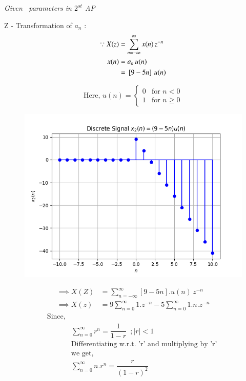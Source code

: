 \documentclass[journal,12pt,twocolumn]{IEEEtran}
\theoremstyle{remark}
\begin{document}
\begin{enumerate} [label=(\roman*)]
    \begin{table}[htbp] 
    \centering
    
    \vspace{0.2cm}
    \caption{\normalsize\textsl{Given \, parameters in $2^{st}$ AP}}
    \label{given parameters list}
    \end{table}

    Z - Transformation of $a_n$ :
    \begin{align}
        \because X(z) &= \sum_{n = -\infty}^{\infty}x(n) \, z^{-n} \\
         x(n)&= a_n\,u(n) \\
        & = {}\left[9-5n\right] \, u(n)
    \end{align}

    \[
    \text{Here},\, u(n) =
    \begin{cases}
        0 & \text{for } n < 0 \\
        1 & \text{for } n \geq 0 
    \end{cases}
    \]

    \begin{figure}[!h] 
    \centering
    \includegraphics[width=\columnwidth]{figs/signal_x2.png}
    \caption{}
    \label{fig:Graph2}
    \end{figure}
    \begin{align}
        \implies  X(Z) &= \sum_{n = -\infty}^{\infty}[9 - 5n].u(n) \, z^{-n} \\
        \implies X(z) &= 9 \sum_{n = 0}^{\infty} 1.z^{-n} - 5 \sum_{n = 0}^{\infty} 1.n.z^{-n}
    \end{align}
    \begin{align}
        \text{Since,} \nonumber\\
        &\sum_{n=0}^{\infty} r^n = \dfrac{1}{1-r}  \,\,\, 
        ; |r|<1 \\
        &\text{Differentiating w.r.t. 'r' and multiplying by 'r' }\nonumber \\
        &\text{we get,} \nonumber \\
        &\sum_{n=0}^{\infty} n.r^n = \dfrac{r}{(1-r)^2}
    \end{align}


\end{enumerate}
\end{document}
